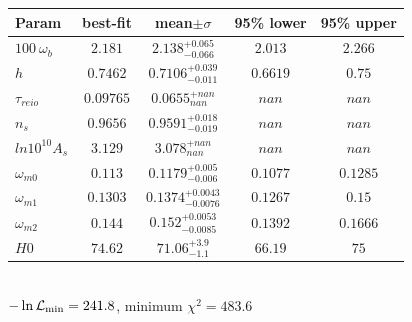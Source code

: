 \begin{tabular}{|l|c|c|c|c|} 
 \hline 
Param & best-fit & mean$\pm\sigma$ & 95\% lower & 95\% upper \\ \hline 
$100~\omega{}_{b }$ &$2.181$ & $2.138_{-0.066}^{+0.065}$ & $2.013$ & $2.266$ \\ 
$h$ &$0.7462$ & $0.7106_{-0.011}^{+0.039}$ & $0.6619$ & $0.75$ \\ 
$\tau{}_{reio }$ &$0.09765$ & $0.0655_{nan}^{+nan}$ & $nan$ & $nan$ \\ 
$n_{s }$ &$0.9656$ & $0.9591_{-0.019}^{+0.018}$ & $nan$ & $nan$ \\ 
$ln10^{10}A_{s }$ &$3.129$ & $3.078_{nan}^{+nan}$ & $nan$ & $nan$ \\ 
$\omega{}_{m0 }$ &$0.113$ & $0.1179_{-0.006}^{+0.005}$ & $0.1077$ & $0.1285$ \\ 
$\omega{}_{m1 }$ &$0.1303$ & $0.1374_{-0.0076}^{+0.0043}$ & $0.1267$ & $0.15$ \\ 
$\omega{}_{m2 }$ &$0.144$ & $0.152_{-0.0085}^{+0.0053}$ & $0.1392$ & $0.1666$ \\ 
$H0$ &$74.62$ & $71.06_{-1.1}^{+3.9}$ & $66.19$ & $75$ \\ 
\hline 
 \end{tabular} \\ 
$-\ln{\cal L}_\mathrm{min} =241.8$, minimum $\chi^2=483.6$ \\ 
